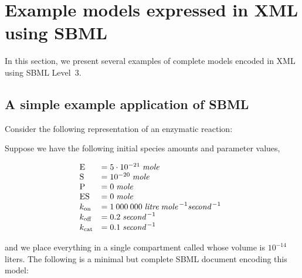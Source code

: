 
\section{Example models expressed in XML using SBML}
\label{sec:xml-rep}
\label{sec:examples}

In this section, we present several examples of complete models
encoded in XML using SBML Level~3.



\subsection{A simple example application of SBML}
\label{sec:modeleg}

Consider the following representation of an enzymatic reaction:
\begin{center}
\end{center}
Suppose we have the following initial species amounts and
parameter values,
\begin{linenomath}
  \begin{equation*}
    \begin{array}{@{}lll@{}}
      \textrm{E}   & = 5 \cdot 10^{-21}\; \emph{mole} \\
      \textrm{S}   & = 10^{-20}\; \emph{mole} \\
      \textrm{P}   & = 0\; \emph{mole} \\
      \textrm{ES}  & = 0\; \emph{mole} \\
      k_{\text{on}}  & = 1\:000\:000 \;\emph{litre} \;\emph{mole}^{\,-1} \emph{second}^{\,-1}\\
      k_{\text{off}} & = 0.2 \;\emph{second}^{\,-1}\\
      k_{\text{cat}} & = 0.1 \;\emph{second}^{\,-1}
    \end{array}
  \end{equation*}
\end{linenomath}
and we place everything in a single compartment called
 whose volume is $10^{-14}$ liters.  The following
is a minimal but complete SBML document encoding this model:


